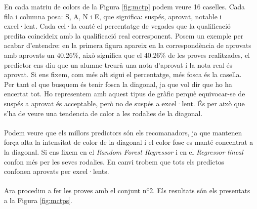 \documentclass[12pt,a4paper,catalan]{article}
\begin{document}
En cada matriu de colors de la Figura \ref{fig:mctp} podem veure 16 caselles. Cada fila i columna posa: S, A, N i E, que significa: suspés, aprovat, notable i excel·lent. Cada cel·la conté el percentatge de vegades que la qualificació predita coincideix amb la qualificació real corresponent. Posem un exemple per acabar d'entendre: en la primera figura apareix en la correspondència de aprovats amb aprovats un 40.26\%, això significa que el 40.26\% de les proves realitzades, el predictor ens diu que un alumne treurà una nota d'aprovat i la nota real és aprovat. Si ens fixem, com més alt sigui el percentatge, més fosca és la casella. Per tant el que busquem és tenir fosca la diagonal, ja que vol dir que ho ha encertat tot. Ho representem amb aquest tipus de gràfic perquè equivocar-se de suspés a aprovat és acceptable, però no de suspés a excel·lent. És per això que s'ha de veure una tendencia de color a les rodalies de la diagonal.
\\
\\
Podem veure que els millors predictors són els recomanadors, ja que mantenen força alta la intensitat de color de la diagonal i el color fosc es manté concentrat a la diagonal. Si ens fixem en el \textit{Random Forest Regressor} i en el \textit{Regressor lineal} confon més per les seves rodalies. En canvi trobem que tots els predictos confonen aprovats per excel·lents.
\\
\\
Ara procedim a fer les proves amb el conjunt nº2. Els resultats són els presentats a la Figura \ref{fig:mctps}.
\end{document}
